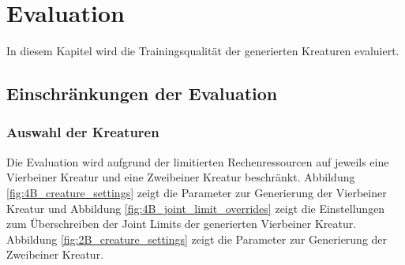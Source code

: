 \chapter{Evaluation}
\label{chap:evaluation}
In diesem Kapitel wird die Trainingsqualität der generierten Kreaturen evaluiert. 

\section{Einschränkungen der Evaluation}\label{Vorlaeufige_Ergebnisse}

\subsection{Auswahl der Kreaturen}
Die Evaluation wird aufgrund der limitierten Rechenressourcen auf jeweils eine Vierbeiner Kreatur und eine Zweibeiner Kreatur beschränkt. Abbildung \ref{fig:4B_creature_settings} zeigt die Parameter zur Generierung der Vierbeiner Kreatur und Abbildung \ref{fig:4B_joint_limit_overrides} zeigt die Einstellungen zum Überschreiben der Joint Limits der generierten Vierbeiner Kreatur. Abbildung \ref{fig:2B_creature_settings} zeigt die Parameter zur Generierung der Zweibeiner Kreatur.

